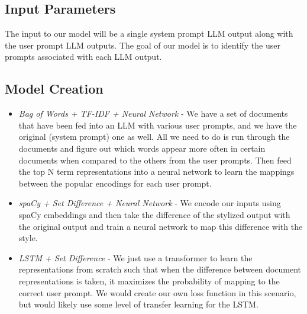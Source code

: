 \documentclass{article}
\begin{document}


\subsection{Input Parameters}

The input to our model will be a single system prompt LLM output along with the user prompt LLM outputs. The goal of our model is to identify the user prompts associated with each LLM output.

\subsection{Model Creation}

\begin{itemize}
    \item \textit{Bag of Words + TF-IDF + Neural Network} - We have a set of documents that have been fed into an LLM with various user prompts, and we have the original (system prompt) one as well. All we need to do is run through the documents and figure out which words appear more often in certain documents when compared to the others from the user prompts. Then feed the top N term representations into a neural network to learn the mappings between the popular encodings for each user prompt.
    \item \textit{spaCy + Set Difference + Neural Network} - We encode our inputs using spaCy embeddings and then take the difference of the stylized output with the original output and train a neural network to map this difference with the style. \cite{spacy2}
    \item \textit{LSTM + Set Difference} - We just use a transformer to learn the representations from scratch such that when the difference between document representations is taken, it maximizes the probability of mapping to the correct user prompt. We would create our own loss function in this scenario, but would likely use some level of transfer learning for the LSTM.
\end{itemize}
\end{document}
